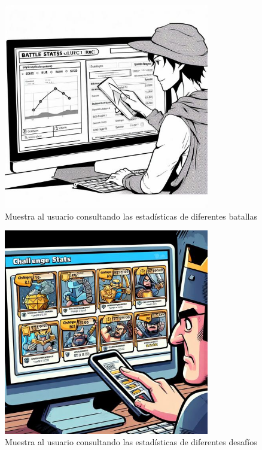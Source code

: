 \begin{figure}[H]
  \centering
  \includegraphics[width=0.8\textwidth]{../images/comic_query_match_stats.jpeg}
  \caption{Muestra al usuario consultando las estadísticas de diferentes batallas}
\end{figure}

\begin{figure}[H]
  \centering
  \includegraphics[width=0.8\textwidth]{../images/comic_query_challenge_stats.jpeg}
  \caption{Muestra al usuario consultando las estadísticas de diferentes desafíos}
\end{figure}

